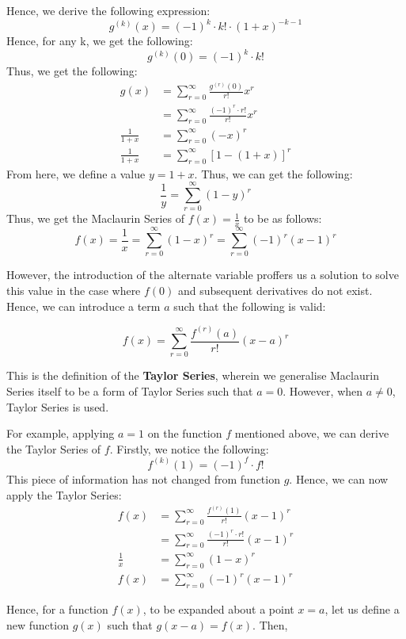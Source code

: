 \documentclass[a4paper,12pt,oneside]{book}
\begin{document}
Hence, we derive the following expression:
\[ g^{(k)}(x) = (-1)^k \cdot k! \cdot \left ( 1 + x \right )^{-k-1} \]
Hence, for any k, we get the following:
\[ g^{(k)}(0) = (-1)^k \cdot k! \]
Thus, we get the following:
\begin{align*}
g(x) &= \sum_{r = 0}^{\infty} \frac{g^{(r)}(0)}{r!} x^r \\
&= \sum_{r = 0}^{\infty} \frac{(-1)^r \cdot r!}{r!} x^r \\
\frac{1}{1+x} &= \sum_{r = 0}^{\infty} \left (-x \right)^r \\
\frac{1}{1+x} &= \sum_{r = 0}^{\infty} \left[1 - \left(1+x \right) \right]^r
\end{align*}
From here, we define a value $y = 1 + x$. Thus, we can get the following:
\[ \frac{1}{y} = \sum_{r = 0}^{\infty} \left(1 - y \right)^r \]
Thus, we get the Maclaurin Series of $ f(x) = \frac{1}{x} $ to be as follows:
\[ f(x) = \frac{1}{x} = \sum_{r = 0}^{\infty} \left(1 - x \right)^r = \sum_{r = 0}^{\infty} (-1)^r \left(x - 1 \right)^r \]

However, the introduction of the alternate variable proffers us a solution to solve this value in the case where $f(0)$ and subsequent derivatives do not exist. Hence, we can introduce a term $a$ such that the following is valid:

\[ f(x) = \sum_{r = 0}^{\infty} \frac{f^{(r)}(a)}{r!} (x-a)^r \]

This is the definition of the \textbf{Taylor Series}, wherein we generalise Maclaurin Series itself to be a form of Taylor Series such that $a = 0$. However, when $a \neq 0$, Taylor Series is used.

For example, applying $a = 1$ on the function $f$ mentioned above, we can derive the Taylor Series of $f$. Firstly, we notice the following:
\[ f^{(k)}(1) = (-1)^f \cdot f! \]
This piece of information has not changed from function $g$.
Hence, we can now apply the Taylor Series:
\begin{align*}
f(x) &= \sum_{r = 0}^{\infty} \frac{f^{(r)}(1)}{r!} (x - 1)^r \\
&= \sum_{r = 0}^{\infty} \frac{(-1)^r \cdot r!}{r!} (x - 1)^r \\
\frac{1}{x} &= \sum_{r = 0}^{\infty} \left (1 - x \right)^r \\
f(x) &= \sum_{r = 0}^{\infty} (-1)^r \left(x - 1 \right)^r
\end{align*}

Hence, for a function $f(x)$, to be expanded about a point $x = a$, let us define a new function $g(x)$ such that $g(x - a) = f(x)$. Then,
\end{document}
